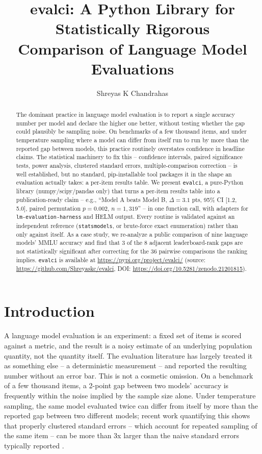 \documentclass[11pt]{article}
\title{evalci: A Python Library for Statistically Rigorous\\ Comparison of Language Model Evaluations}
\author{Shreyas K Chandrahas}
\date{}
\begin{document}
\maketitle

\begin{abstract}
The dominant practice in language model evaluation is to report a single accuracy
number per model and declare the higher one better, without testing whether the
gap could plausibly be sampling noise. On benchmarks of a few thousand items, and
under temperature sampling where a model can differ from itself run to run by more
than the reported gap between models, this practice routinely overstates
confidence in headline claims. The statistical machinery to fix this --
confidence intervals, paired significance tests, power analysis, clustered
standard errors, multiple-comparison correction -- is well established, but no
standard, pip-installable tool packages it in the shape an evaluation actually
takes: a per-item results table. We present \texttt{evalci}, a pure-Python
library (numpy/scipy/pandas only) that turns a per-item results table into a
publication-ready claim -- e.g., ``Model A beats Model B, $\Delta=3.1$ pts, 95\%
CI [1.2, 5.0], paired permutation $p=0.002$, $n=1{,}319$'' -- in one function
call, with adapters for \texttt{lm-evaluation-harness} and HELM output. Every
routine is validated against an independent reference (\texttt{statsmodels},
or brute-force exact enumeration) rather than only against itself. As a case
study, we re-analyze a public comparison of nine language models' MMLU accuracy
and find that 3 of the 8 adjacent leaderboard-rank gaps are not statistically
significant after correcting for the 36 pairwise comparisons the ranking
implies. \texttt{evalci} is available at
\url{https://pypi.org/project/evalci/} (source:
\url{https://github.com/Shreyaskc/evalci}, DOI:
\url{https://doi.org/10.5281/zenodo.21201815}).
\end{abstract}

\section{Introduction}

A language model evaluation is an experiment: a fixed set of items is scored
against a metric, and the result is a noisy estimate of an underlying
population quantity, not the quantity itself. The evaluation literature has
largely treated it as something else -- a deterministic measurement -- and
reported the resulting number without an error bar. This is not a cosmetic
omission. On a benchmark of a few thousand items, a 2-point gap between two
models' accuracy is frequently within the noise implied by the sample size
alone. Under temperature sampling, the same model evaluated twice can differ
from itself by more than the reported gap between two different models; recent
work quantifying this shows that properly clustered standard errors -- which
account for repeated sampling of the same item -- can be more than 3x larger
than the naive standard errors typically reported \citep{miller2024}.
\end{document}
